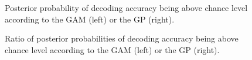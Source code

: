 \documentclass[
  doc,
  floatsintext,
  longtable,
  a4paper,
  nolmodern,
  notxfonts,
  notimes,
  colorlinks=true,linkcolor=blue,citecolor=blue,urlcolor=blue]{apa7}
\begin{document}
\begin{figure}[!htb]

\caption{\label{fig-decoding-post}Posterior probability of decoding
accuracy being above chance level according to the GAM (left) or the GP
(right).}


\end{figure}%

\begin{figure}[!htb]

\caption{\label{fig-decoding-ratio}Ratio of posterior probabilities of
decoding accuracy being above chance level according to the GAM (left)
or the GP (right).}


\end{figure}%

\newpage
\end{document}
